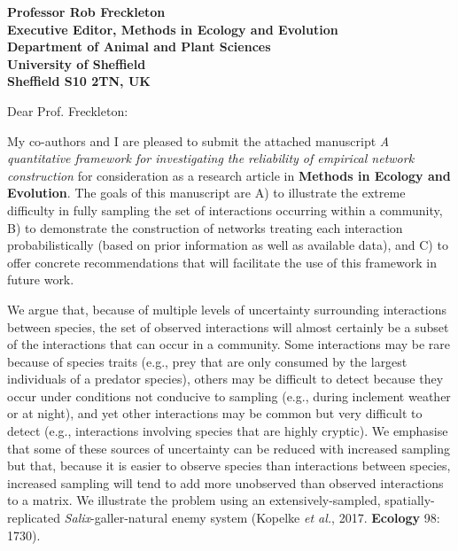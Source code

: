 \documentclass[12pt]{letter}
\begin{document}
\begin{letter}{\bf Professor Rob Freckleton\\
               Executive Editor, Methods in Ecology and Evolution\\
               Department of Animal and Plant Sciences\\
               University of Sheffield\\
               Sheffield S10 2TN, UK
                               }


\opening{Dear Prof. Freckleton:}

    My co-authors and I are pleased to submit the attached manuscript \emph{A quantitative framework for investigating the reliability of empirical network construction} for consideration as a research article in \textbf{Methods in Ecology and Evolution}. The goals of this manuscript are A) to illustrate the extreme difficulty in fully sampling the set of interactions occurring within a community, B) to demonstrate the construction of networks treating each interaction probabilistically (based on prior information as well as available data), and C) to offer concrete recommendations that will facilitate the use of this framework in future work.


    We argue that, because of multiple levels of uncertainty surrounding interactions between species, the set of observed interactions will almost certainly be a subset of the interactions that can occur in a community. Some interactions may be rare because of species traits (e.g., prey that are only consumed by the largest individuals of a predator species), others may be difficult to detect because they occur under conditions not conducive to sampling (e.g., during inclement weather or at night), and yet other interactions may be common but very difficult to detect (e.g., interactions involving species that are highly cryptic). We emphasise that some of these sources of uncertainty can be reduced with increased sampling but that, because it is easier to observe species than interactions between species, increased sampling will tend to add more unobserved than observed interactions to a matrix. We illustrate the problem using an extensively-sampled, spatially-replicated \emph{Salix}-galler-natural enemy system (Kopelke \emph{et al.}, 2017. \textbf{Ecology} 98: 1730).



\end{letter}
\end{document}
